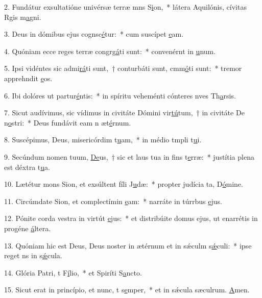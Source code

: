 2. Fundátur exsultatióne univérsæ terræ mns S\uline{i}on,~* látera Aquilónis, cívitas Rgis m\uline{a}gni.\par 
3. Deus in dómibus ejus cognsc\uline{é}tur:~* cum suscípet \uline{e}am.\par 
4. Quóniam ecce reges terræ congrg\uline{á}ti sunt:~* convenérnt in \uline{u}num.\par 
5. Ipsi vidéntes sic admi\uline{rá}ti sunt,~† conturbáti sunt, cmm\uline{ó}ti sunt:~* tremor apprehndit \uline{e}os.\par 
6. Ibi dolóres ut partur\uline{é}ntis:~* in spíritu veheménti cónteres nves Th\uline{a}rsis.\par 
7. Sicut audívimus, sic vídimus in civitáte Dómini vir\uline{tú}tum,~† in civitáte De n\uline{o}stri:~* Deus fundávit eam n æt\uline{é}rnum.\par 
8. Suscépimus, Deus, misericórdim t\uline{u}am,~* in médio tmpli t\uline{u}i.\par 
9. Secúndum nomen tuum, \uline{De}us,~† sic et laus tua in fins t\uline{e}rræ:~* justítia plena est déxtra t\uline{u}a.\par 
10. Lætétur mons Sion, et exsúltent fíli J\uline{u}dæ:~* propter judícia ta, D\uline{ó}mine.\par 
11. Circúmdate Sion, et complectímin \uline{e}am:~* narráte in túrrbus \uline{e}jus.\par 
12. Pónite corda vestra in virtút \uline{e}jus:~* et distribúite domus ejus, ut enarrétis in progéne \uline{á}ltera.\par 
13. Quóniam hic est Deus, Deus noster in ætérnum et in sǽculm s\uline{ǽ}culi:~* ipse reget ns in s\uline{ǽ}cula.\par 
14. Glória Patri, t F\uline{í}lio,~* et Spiríti S\uline{a}ncto.\par 
15. Sicut erat in princípio, et nunc, t s\uline{e}mper,~* et in sǽcula sæculrum. \uline{A}men.\par 
